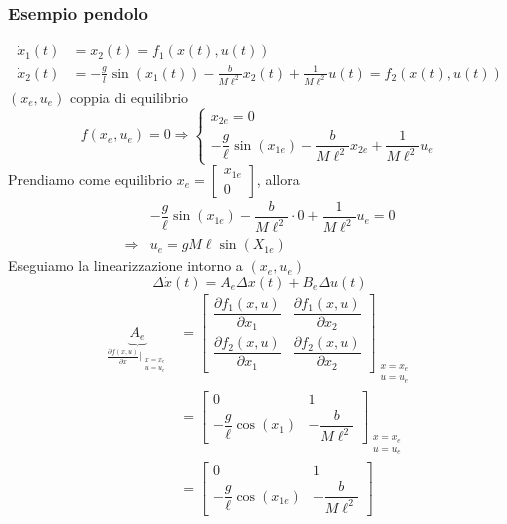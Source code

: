 \documentclass{article}
\numberwithin{equation}{subsection}
\begin{document}
\subsubsection{Esempio pendolo}
\begin{align*}
    \dot x_1(t) &= x_2(t) = f_1(x(t),u(t))\\
    \dot x_2(t) &= - \frac{g}{l} \sin(x_1(t)) - \frac{b}{M \ell^2}x_2(t) + \frac{1}{M \ell^2} u(t) = f_2(x(t),u(t))
\end{align*}
$(x_e,u_e)$ coppia di equilibrio
\begin{equation}
    f(x_e,u_e)=0 \Rightarrow 
    \begin{cases}
        x_{2e}=0\\
        - \dfrac{g}{\ell} \sin(x_{1e}) - \dfrac{b}{M \ell^2}x_{2e} + \dfrac{1}{M \ell^2}u_e
    \end{cases}
\end{equation}
Prendiamo come equilibrio $x_e = \begin{bmatrix} x_{1e}\\0 \end{bmatrix}$, allora
\begin{align*}
    &- \dfrac{g}{\ell} \sin(x_{1e}) - \dfrac{b}{M \ell^2} \cdot 0 + \dfrac{1}{M \ell^2}u_e = 0\\
    \Longrightarrow & u_e = gM\ell \sin(X_{1e})
\end{align*}
Eseguiamo la linearizzazione intorno a $(x_e,u_e)$
\begin{equation}
    \Delta \dot x(t) = A_e \Delta x(t) + B_e \Delta u(t)
\end{equation}
\begin{align*}
    \underbrace{A_e}_{\frac{\partial f(x,u)}{\partial x}\big|_{\substack{\text{$x=x_e$} \\ \text{$u=u_e$}}}} &=
    \begin{bmatrix}
        \dfrac{\partial f_1(x,u)}{\partial x_1} & \dfrac{\partial f_1(x,u)}{\partial x_2}\\
        \dfrac{\partial f_2(x,u)}{\partial x_1} & \dfrac{\partial f_2(x,u)}{\partial x_2}
    \end{bmatrix}_{\substack{\text{$x=x_e$} \\ \text{$u=u_e$}}}\\ &=
    \begin{bmatrix}
        0 & 1\\
        -\dfrac{g}{\ell}\cos(x_1) & -\dfrac{b}{M \ell^2}
    \end{bmatrix}_{\substack{\text{$x=x_e$} \\ \text{$u=u_e$}}} \\ &=
    \begin{bmatrix}
        0 & 1\\
        -\dfrac{g}{\ell}\cos(x_{1e}) & -\dfrac{b}{M \ell^2}
    \end{bmatrix}
\end{align*}
\end{document}
